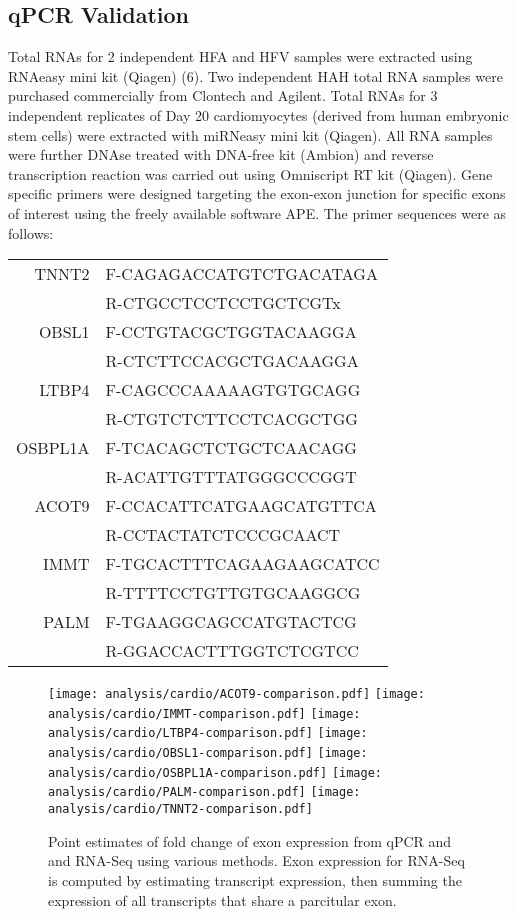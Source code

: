 \documentclass{article}
\begin{document}
\subsection{qPCR Validation}\label{cardioqpcr}

Total RNAs for 2 independent HFA and HFV samples were extracted using RNAeasy
mini kit (Qiagen) (6). Two independent HAH total RNA samples were purchased
commercially from Clontech and Agilent. Total RNAs for 3 independent replicates
of Day 20 cardiomyocytes (derived from human embryonic stem cells) were
extracted with miRNeasy mini kit (Qiagen). All RNA samples were further DNAse
treated with DNA-free kit (Ambion) and reverse transcription reaction was
carried out using Omniscript RT kit (Qiagen). Gene specific primers were
designed targeting the exon-exon junction for specific exons of interest using
the freely available software APE. The primer sequences were as follows:

\begin{center}
\begin{tabular}{rl}
TNNT2   & F-CAGAGACCATGTCTGACATAGA \\
        & R-CTGCCTCCTCCTGCTCGTx \\
OBSL1   & F-CCTGTACGCTGGTACAAGGA \\
        & R-CTCTTCCACGCTGACAAGGA \\
LTBP4   & F-CAGCCCAAAAAGTGTGCAGG \\
        & R-CTGTCTCTTCCTCACGCTGG \\
OSBPL1A & F-TCACAGCTCTGCTCAACAGG \\
        & R-ACATTGTTTATGGGCCCGGT \\
ACOT9   & F-CCACATTCATGAAGCATGTTCA \\
        & R-CCTACTATCTCCCGCAACT \\
IMMT    & F-TGCACTTTCAGAAGAAGCATCC \\
        & R-TTTTCCTGTTGTGCAAGGCG \\
PALM    & F-TGAAGGCAGCCATGTACTCG \\
        & R-GGACCACTTTGGTCTCGTCC
\end{tabular}
\end{center}

\begin{figure}
\texttt{[image: analysis/cardio/ACOT9-comparison.pdf]}
\texttt{[image: analysis/cardio/IMMT-comparison.pdf]}
\texttt{[image: analysis/cardio/LTBP4-comparison.pdf]}
\texttt{[image: analysis/cardio/OBSL1-comparison.pdf]}
\texttt{[image: analysis/cardio/OSBPL1A-comparison.pdf]}
\texttt{[image: analysis/cardio/PALM-comparison.pdf]}
\texttt{[image: analysis/cardio/TNNT2-comparison.pdf]}
\caption{Point estimates of fold change of exon expression from qPCR and and
RNA-Seq using various methods. Exon expression for RNA-Seq is computed by
estimating transcript expression, then summing the expression of all transcripts
that share a parcitular exon.}
\label{fig:cardiofoldchange}
\end{figure}
\end{document}
